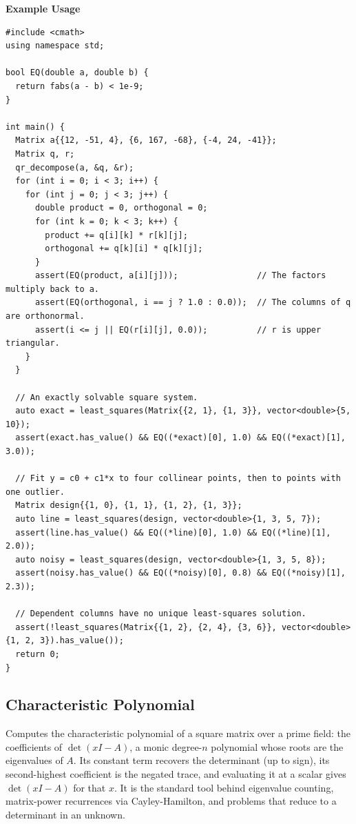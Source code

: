 \textbf{Example Usage}\par
\begin{lstlisting}[style=cpp]
#include <cmath>
using namespace std;

bool EQ(double a, double b) {
  return fabs(a - b) < 1e-9;
}

int main() {
  Matrix a{{12, -51, 4}, {6, 167, -68}, {-4, 24, -41}};
  Matrix q, r;
  qr_decompose(a, &q, &r);
  for (int i = 0; i < 3; i++) {
    for (int j = 0; j < 3; j++) {
      double product = 0, orthogonal = 0;
      for (int k = 0; k < 3; k++) {
        product += q[i][k] * r[k][j];
        orthogonal += q[k][i] * q[k][j];
      }
      assert(EQ(product, a[i][j]));                // The factors multiply back to a.
      assert(EQ(orthogonal, i == j ? 1.0 : 0.0));  // The columns of q are orthonormal.
      assert(i <= j || EQ(r[i][j], 0.0));          // r is upper triangular.
    }
  }

  // An exactly solvable square system.
  auto exact = least_squares(Matrix{{2, 1}, {1, 3}}, vector<double>{5, 10});
  assert(exact.has_value() && EQ((*exact)[0], 1.0) && EQ((*exact)[1], 3.0));

  // Fit y = c0 + c1*x to four collinear points, then to points with one outlier.
  Matrix design{{1, 0}, {1, 1}, {1, 2}, {1, 3}};
  auto line = least_squares(design, vector<double>{1, 3, 5, 7});
  assert(line.has_value() && EQ((*line)[0], 1.0) && EQ((*line)[1], 2.0));
  auto noisy = least_squares(design, vector<double>{1, 3, 5, 8});
  assert(noisy.has_value() && EQ((*noisy)[0], 0.8) && EQ((*noisy)[1], 2.3));

  // Dependent columns have no unique least-squares solution.
  assert(!least_squares(Matrix{{1, 2}, {2, 4}, {3, 6}}, vector<double>{1, 2, 3}).has_value());
  return 0;
}
\end{lstlisting}
\subsection{Characteristic Polynomial}
\label{sec:6.5.6}
Computes the characteristic polynomial of a square matrix over a prime field: the coefficients of $\det(xI - A)$, a monic degree-$n$ polynomial whose roots are the eigenvalues of $A$. Its constant term recovers the determinant (up to sign), its second-highest coefficient is the negated trace, and evaluating it at a scalar gives $\det(xI - A)$ for that $x$. It is the standard tool behind eigenvalue counting, matrix-power recurrences via Cayley-Hamilton, and problems that reduce to a determinant in an unknown.

